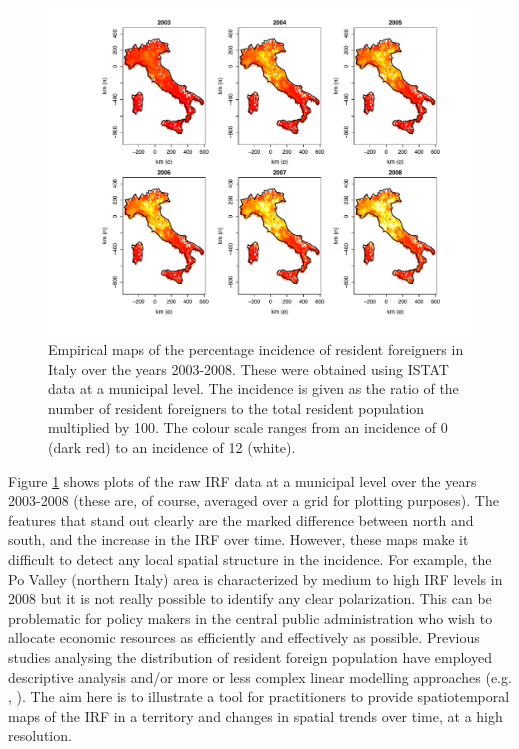 \begin{figure}[tbp]
	\centering
		\includegraphics[width=\textwidth]{it/Raw}
	\caption{Empirical maps of the percentage incidence of resident foreigners in Italy over the years 2003-2008. These were obtained using ISTAT data at a municipal level.	The incidence is given as the ratio of the number of resident foreigners to the total resident population multiplied by 100. The colour scale ranges from an incidence of 0 (dark red) to an incidence of 12 (white).}
	\label{Rd}
\end{figure}

Figure \ref{Rd} shows plots of the raw IRF data at a municipal level over the years 2003-2008 (these are, of course, averaged over a grid for plotting purposes). The features that stand out clearly are the marked difference between north and south, and the increase in the IRF over time. However, these maps make it difficult to detect any local spatial structure in the incidence. For example, the Po Valley (northern Italy) area is characterized by medium to high IRF levels in 2008 but it is not really possible to identify any clear polarization. This can be problematic for policy makers in the central public administration who wish to allocate economic resources as efficiently and effectively as possible. Previous studies analysing the distribution of resident foreign population have employed descriptive analysis and/or more or less complex linear modelling approaches (e.g. \cite{Fonseca2008}, \cite{Longhi2010}). The aim here is to illustrate a tool for practitioners to provide spatiotemporal maps of the IRF in a territory and changes in spatial trends over time, at a high resolution.


